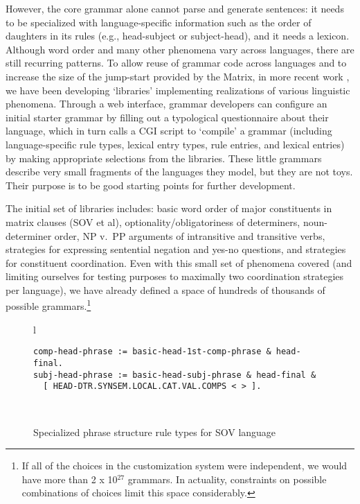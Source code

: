 \documentclass[11pt]{article}
\begin{document}
However, the core grammar alone cannot parse and generate sentences:
it needs to be specialized with language-specific information such as
the order of daughters in its rules (e.g., head-subject or
subject-head), and it needs a lexicon.  Although word order and many
other phenomena vary across languages, there are still recurring
patterns.  To allow reuse of grammar code across languages and to
increase the size of the jump-start provided by the Matrix, in more
recent work \cite{Ben:Fli:05,Dre:Ben:05}, we have been developing
`libraries' implementing realizations of various linguistic phenomena.
Through a web interface, grammar developers can configure an initial
starter grammar by filling out a typological questionnaire about their
language, which in turn calls a CGI script to `compile' a grammar
(including language-specific rule types, lexical entry types, rule
entries, and lexical entries) by making appropriate selections from
the libraries. These little grammars describe very small fragments of
the languages they model, but they are not toys.  Their purpose is to
be good starting points for further development.

The initial set of libraries includes: basic word order of major
constituents in matrix clauses (SOV et al), optionality/obligatoriness
of determiners, noun-determiner order, NP v.\ PP arguments of
intransitive and transitive verbs, strategies for expressing
sentential negation and yes-no questions, and strategies for
constituent coordination.  Even with this small set of phenomena
covered (and limiting ourselves for testing purposes to 
maximally two coordination strategies per language), we have already
defined a space of hundreds of thousands of possible
grammars.\footnote{If all of the choices in the customization system
were independent, we would have more than 2 x 10$^{27}$ grammars.  In
actuality, constraints on possible combinations of choices limit this space considerably.}

\begin{figure*}[ht]
\small
\begin{center}
\begin{tabular}{l}
\begin{minipage}{5in}
\begin{verbatim}
comp-head-phrase := basic-head-1st-comp-phrase & head-final.
subj-head-phrase := basic-head-subj-phrase & head-final &
  [ HEAD-DTR.SYNSEM.LOCAL.CAT.VAL.COMPS < > ].
\end{verbatim}
\end{minipage}\\
\end{tabular}
\end{center}
\caption{Specialized phrase structure rule types for SOV language}
\label{tdlfig}
\end{figure*}
\end{document}
